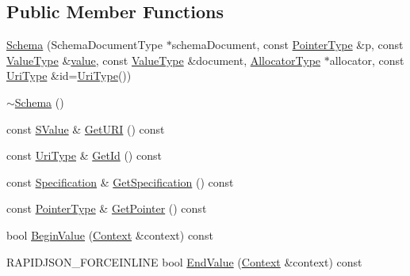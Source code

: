 \subsection*{Public Member Functions}
\begin{DoxyCompactItemize}
\item 
\hyperlink{classinternal_1_1Schema_a7725acd72292490caf8605fbd8e2fa9c}{Schema} (Schema\+Document\+Type $\ast$schema\+Document, const \hyperlink{classinternal_1_1Schema_a13d7dbba6e4a77b10862546777c5aae8}{Pointer\+Type} \&p, const \hyperlink{classinternal_1_1Schema_a8976b6d7e2a885483d0b51d941019340}{Value\+Type} \&\hyperlink{imgui__impl__opengl3__loader_8h_a32aff7c6c4cd253fdf6563677afab5ce}{value}, const \hyperlink{classinternal_1_1Schema_a8976b6d7e2a885483d0b51d941019340}{Value\+Type} \&document, \hyperlink{classinternal_1_1Schema_a7af392edd81e610754cd2e6b4f82761c}{Allocator\+Type} $\ast$allocator, const \hyperlink{classinternal_1_1Schema_a3b6cd85c3eeebe870cf8017d9d131d35}{Uri\+Type} \&id=\hyperlink{classinternal_1_1Schema_a3b6cd85c3eeebe870cf8017d9d131d35}{Uri\+Type}())
\item 
\hyperlink{classinternal_1_1Schema_a458f60f9fee54d74ac1f607bcf4e4ddc}{$\sim$\+Schema} ()
\item 
const \hyperlink{classinternal_1_1Schema_ab3a07540a27d4cc2b0e260290c5c5771}{S\+Value} \& \hyperlink{classinternal_1_1Schema_a8b48d8d85c2828a1067227582f3efd5f}{Get\+U\+RI} () const
\item 
const \hyperlink{classinternal_1_1Schema_a3b6cd85c3eeebe870cf8017d9d131d35}{Uri\+Type} \& \hyperlink{classinternal_1_1Schema_a17a88cfe3a40ff8476336697813e2e00}{Get\+Id} () const
\item 
const \hyperlink{structSpecification}{Specification} \& \hyperlink{classinternal_1_1Schema_a4a493e850ddc13776d09058bd5d74f58}{Get\+Specification} () const
\item 
const \hyperlink{classinternal_1_1Schema_a13d7dbba6e4a77b10862546777c5aae8}{Pointer\+Type} \& \hyperlink{classinternal_1_1Schema_a3854ebdf4d9d0b1b1c5dbcdb4439dca7}{Get\+Pointer} () const
\item 
bool \hyperlink{classinternal_1_1Schema_ae978defa6c4210365bdb3571643a0d40}{Begin\+Value} (\hyperlink{classinternal_1_1Schema_ac3f54abfefe300c5610c1205869cfd66}{Context} \&context) const
\item 
R\+A\+P\+I\+D\+J\+S\+O\+N\+\_\+\+F\+O\+R\+C\+E\+I\+N\+L\+I\+NE bool \hyperlink{classinternal_1_1Schema_afced5d191620cfdf0971fdd30b004686}{End\+Value} (\hyperlink{classinternal_1_1Schema_ac3f54abfefe300c5610c1205869cfd66}{Context} \&context) const

\end{DoxyCompactItemize}
